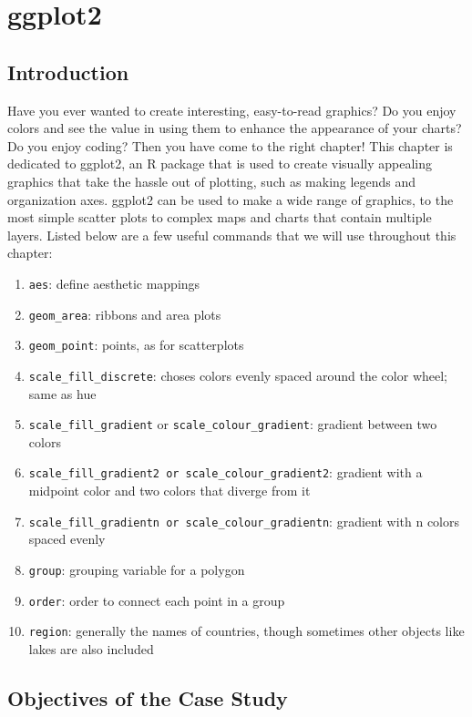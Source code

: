 \chapter{ggplot2}
\section{Introduction}

Have you ever wanted to create interesting, easy-to-read graphics?
Do you enjoy colors and see the value in using them to enhance the appearance of your charts?
Do you enjoy coding?
Then you have come to the right chapter!
This chapter is dedicated to ggplot2, an R package that is used to create visually appealing graphics that take the hassle out of plotting, such as making legends and organization axes. \cite{ggplot2}
ggplot2 can be used to make a wide range of graphics, to the most simple scatter plots to complex maps and charts that contain multiple layers.
Listed below are a few useful commands that we will use throughout this chapter:

\begin{enumerate}
\item \texttt{aes}: define aesthetic mappings
\item \texttt{geom\_area}: ribbons and area plots
\item \texttt{geom\_point}: points, as for scatterplots
\item \texttt{scale\_fill\_discrete}: choses colors evenly spaced around the color wheel; same as hue
\item \texttt{scale\_fill\_gradient} or \texttt{scale\_colour\_gradient}: gradient between two colors
\item \texttt{scale\_fill\_gradient2 or scale\_colour\_gradient2}: gradient with a midpoint color and two colors that diverge from it
\item \texttt{scale\_fill\_gradientn or scale\_colour\_gradientn}: gradient with n colors spaced evenly
\item \texttt{group}: grouping variable for a polygon
\item \texttt{order}: order to connect each point in a group
\item \texttt{region}: generally the names of countries, though sometimes other objects like lakes are also included
\end{enumerate}

\section{Objectives of the Case Study}

